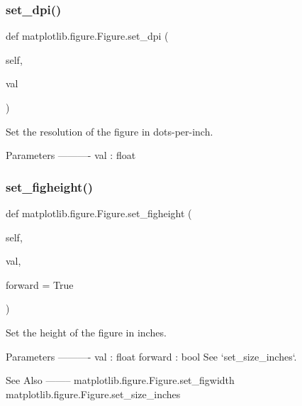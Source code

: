 \subsubsection{\texorpdfstring{set\+\_\+dpi()}{set\_dpi()}}
{\footnotesize\ttfamily def matplotlib.\+figure.\+Figure.\+set\+\_\+dpi (\begin{DoxyParamCaption}\item[{}]{self,  }\item[{}]{val }\end{DoxyParamCaption})}

\begin{DoxyVerb}Set the resolution of the figure in dots-per-inch.

Parameters
----------
val : float
\end{DoxyVerb}
 \mbox{\label{classmatplotlib_1_1figure_1_1Figure_ab39f18d7d3404de2baeaac109d4645a0}} 
\subsubsection{\texorpdfstring{set\+\_\+figheight()}{set\_figheight()}}
{\footnotesize\ttfamily def matplotlib.\+figure.\+Figure.\+set\+\_\+figheight (\begin{DoxyParamCaption}\item[{}]{self,  }\item[{}]{val,  }\item[{}]{forward = {\ttfamily True} }\end{DoxyParamCaption})}

\begin{DoxyVerb}Set the height of the figure in inches.

Parameters
----------
val : float
forward : bool
    See `set_size_inches`.

See Also
--------
matplotlib.figure.Figure.set_figwidth
matplotlib.figure.Figure.set_size_inches
\end{DoxyVerb}
 \mbox{\label{classmatplotlib_1_1figure_1_1Figure_af34fc85031256b1c3fa752afc251a5e1}} 
